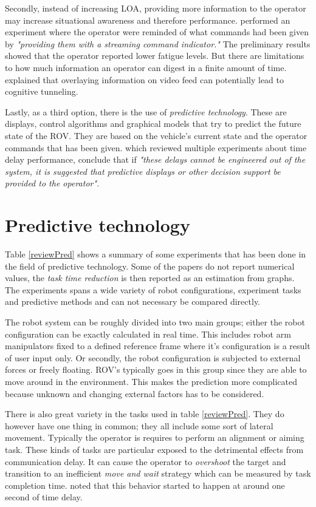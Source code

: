 Secondly, instead of increasing LOA, providing more information to the operator may increase situational awareness and therefore performance. \citep{Miller2005} performed an experiment where the operator were reminded of what commands had been given by \emph{"providing them with a streaming command indicator."} The preliminary results showed that the operator reported lower fatigue levels. But there are limitations to how much information an operator can digest in a finite amount of time. \citep{Chen2007} explained that overlaying information on video feed can potentially lead to cognitive tunneling.

Lastly, as a third option, there is the use of \emph{predictive technology}. These are displays, control algorithms and graphical models that try to predict the future state of the ROV. They are based on the vehicle's current state and the operator commands that has been given. \citep{Chen2007} which reviewed multiple experiments about time delay performance, conclude that if \emph{"these delays cannot be engineered out of the system, it is suggested that predictive displays or other decision support be provided to the operator".}


\section{Predictive technology}



Table \ref{reviewPred} shows a summary of some experiments that has been done in the field of predictive technology. Some of the papers do not report numerical values, the \emph{task time reduction} is then reported as an estimation from graphs. The experiments spans a wide variety of robot configurations, experiment tasks and predictive methods and can not necessary be compared directly.

The robot system can be roughly divided into two main groups; either the robot configuration can be exactly calculated in real time. This includes robot arm manipulators fixed to a defined reference frame where it's configuration is a result of user input only. Or secondly, the robot configuration is subjected to external forces or freely floating. ROV's typically goes in this group since they are able to move around in the environment. This makes the prediction more complicated because unknown and changing external factors has to be considered.

There is also great variety in the tasks used in table \ref{reviewPred}. They do however have one thing in common; they all include some sort of lateral movement. Typically the operator is requires to perform an alignment or aiming task. These kinds of tasks are particular exposed to the detrimental effects from communication delay. It can cause the operator to \emph{overshoot} the target and transition to an inefficient \emph{move and wait} strategy which can be measured by task completion time. \citep{Lane2002} noted that this behavior started to happen at around one second of time delay.

